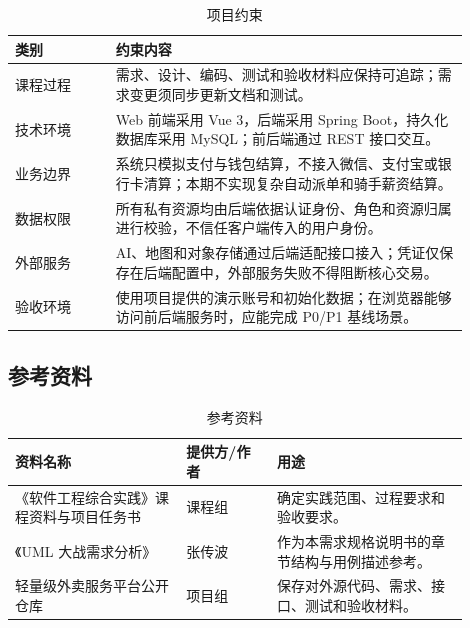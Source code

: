 \begin{longtable}{|L{0.20\linewidth}|L{0.70\linewidth}|}
\caption{项目约束}\label{tab:constraints}\\ \hline
\textbf{类别} & \textbf{约束内容} \\ \hline
课程过程 & 需求、设计、编码、测试和验收材料应保持可追踪；需求变更须同步更新文档和测试。 \\ \hline
技术环境 & Web 前端采用 Vue 3，后端采用 Spring Boot，持久化数据库采用 MySQL；前后端通过 REST 接口交互。 \\ \hline
业务边界 & 系统只模拟支付与钱包结算，不接入微信、支付宝或银行卡清算；本期不实现复杂自动派单和骑手薪资结算。 \\ \hline
数据权限 & 所有私有资源均由后端依据认证身份、角色和资源归属进行校验，不信任客户端传入的用户身份。 \\ \hline
外部服务 & AI、地图和对象存储通过后端适配接口接入；凭证仅保存在后端配置中，外部服务失败不得阻断核心交易。 \\ \hline
验收环境 & 使用项目提供的演示账号和初始化数据；在浏览器能够访问前后端服务时，应能完成 P0/P1 基线场景。 \\ \hline
\end{longtable}

\subsection{参考资料}

\begin{longtable}{|L{0.34\linewidth}|L{0.18\linewidth}|L{0.38\linewidth}|}
\caption{参考资料}\label{tab:references}\\ \hline
\textbf{资料名称} & \textbf{提供方/作者} & \textbf{用途} \\ \hline
《软件工程综合实践》课程资料与项目任务书 & 课程组 & 确定实践范围、过程要求和验收要求。 \\ \hline
《UML 大战需求分析》& 张传波 & 作为本需求规格说明书的章节结构与用例描述参考。 \\ \hline
轻量级外卖服务平台公开仓库 & 项目组 & 保存对外源代码、需求、接口、测试和验收材料。 \\ \hline
\end{longtable}
